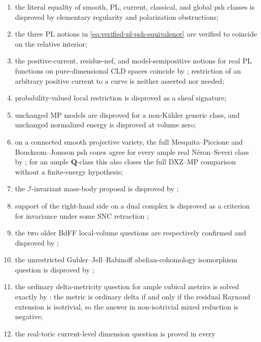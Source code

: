 \begin{enumerate}
\item the literal equality of smooth, PL, current, classical, and global psh
      classes is disproved by elementary regularity and polarization
      obstructions;
\item the three PL notions in
      \eqref{eq:verified-pl-psh-equivalence} are verified to coincide on the
      relative interior;
\item the positive-current, residue-nef, and model-semipositive notions for
      real PL functions on pure-dimensional CLD spaces coincide by
      ; restriction of an
      arbitrary positive current to a curve is neither asserted nor needed;
\item probability-valued local restriction is disproved as a sheaf
      signature;
\item unchanged MP models are disproved for a non-Kähler generic class, and
      unchanged normalized energy is disproved at volume zero;
\item on a connected smooth projective variety, the full
      Mesquita--Piccione and Boucksom--Jonsson psh cones agree for every
      ample real N\'eron--Severi class by
      ; for an ample
      \(\mathbf Q\)-class this also closes the full DXZ--MP comparison
      without a finite-energy hypothesis;
\item the \(\mathcal I\)-invariant mass-body proposal is disproved by
      ;
\item support of the right-hand side on a dual complex is disproved as a
      criterion for invariance under some SNC retraction
      \cite{BJGreen24};
\item the two older BdFF local-volume questions are respectively confirmed
      and disproved by \cite{Zhang14LocalVolume};
\item the unrestricted Gubler--Jell--Rabinoff abelian-cohomology isomorphism
      question is disproved by
      ;
\item the ordinary delta-metricity question for ample cubical metrics is
      solved exactly by : the metric
      is ordinary delta if and only if the residual Raynaud extension is
      isotrivial, so the answer in non-isotrivial mixed reduction is
      negative;
\item the real-toric current-level dimension question is proved in every

\end{enumerate}
